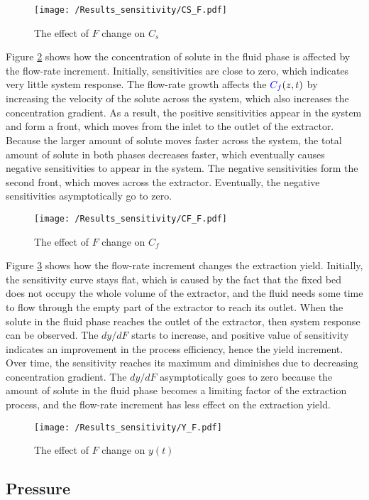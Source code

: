 \documentclass[../Article_Model_Parameters.tex]{subfiles}
\begin{document}
    \begin{figure}[h!]
    	\centering
    	\texttt{[image: /Results\_sensitivity/CS\_F.pdf]}
    	\caption{The effect of $F$ change on $C_s$}
    	\label{fig:Sensitivty_F_CS}
    \end{figure}
    
    Figure \ref{fig:Sensitivty_F_CF} shows how the concentration of solute in the fluid phase is affected by the flow-rate increment. Initially, sensitivities are close to zero, which indicates very little system response. The flow-rate growth affects the ${\color{blue}C_f}(z,t)$ by increasing the velocity of the solute across the system, which also increases the concentration gradient. As a result, the positive sensitivities appear in the system and form a front, which moves from the inlet to the outlet of the extractor. Because the larger amount of solute moves faster across the system, the total amount of solute in both phases decreases faster, which eventually causes negative sensitivities to appear in the system. The negative sensitivities form the second front, which moves across the extractor. Eventually, the negative sensitivities asymptotically go to zero.
    
    \begin{figure}[h!]
    	\centering
    	\texttt{[image: /Results\_sensitivity/CF\_F.pdf]}
    	\caption{The effect of $F$ change on $C_f$}
    	\label{fig:Sensitivty_F_CF}
    \end{figure}
    
    Figure \ref{fig:Sensitivty_F_y} shows how the flow-rate increment changes the extraction yield. Initially, the sensitivity curve stays flat, which is caused by the fact that the fixed bed does not occupy the whole volume of the extractor, and the fluid needs some time to flow through the empty part of the extractor to reach its outlet. When the solute in the fluid phase reaches the outlet of the extractor, then system response can be observed. The $dy/dF$ starts to increase, and positive value of sensitivity indicates an improvement in the process efficiency, hence the yield increment. Over time, the sensitivity reaches its maximum and diminishes due to decreasing concentration gradient. The $dy/dF$ asymptotically goes to zero because the amount of solute in the fluid phase becomes a limiting factor of the extraction process, and the flow-rate increment has less effect on the extraction yield.
    
    \begin{figure}[h!]
    	\centering
    	\texttt{[image: /Results\_sensitivity/Y\_F.pdf]}
    	\caption{The effect of $F$ change on $y(t)$}
    	\label{fig:Sensitivty_F_y}
    \end{figure}
    
    \subsection{Pressure}
    
	
\end{document}
